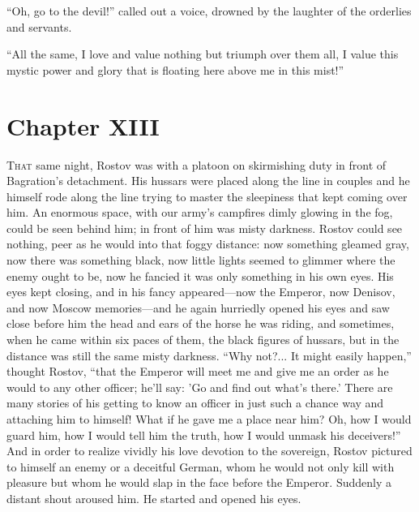 ``Oh, go to the devil!'' called out a voice, drowned by the
laughter of the orderlies and servants.

``All the same, I love and value nothing but triumph over them
all, I value this mystic power and glory that is floating here
above me in this mist!''


\chapter*{Chapter XIII}
\ifaudio     
{} 
\fi

\lettrine[lines=2, loversize=0.3, lraise=0]{\initfamily T}{hat}
same night, Rostov was with a platoon on skirmishing duty in
front of Bagration's detachment. His hussars were placed along
the line in couples and he himself rode along the line trying to
master the sleepiness that kept coming over him. An enormous
space, with our army's campfires dimly glowing in the fog, could
be seen behind him; in front of him was misty darkness. Rostov
could see nothing, peer as he would into that foggy distance: now
something gleamed gray, now there was something black, now little
lights seemed to glimmer where the enemy ought to be, now he
fancied it was only something in his own eyes. His eyes kept
closing, and in his fancy appeared---now the Emperor, now
Denisov, and now Moscow memories---and he again hurriedly opened
his eyes and saw close before him the head and ears of the horse
he was riding, and sometimes, when he came within six paces of
them, the black figures of hussars, but in the distance was still
the same misty darkness. ``Why not?... It might easily happen,''
thought Rostov, ``that the Emperor will meet me and give me an
order as he would to any other officer; he'll say: 'Go and find
out what's there.' There are many stories of his getting to know
an officer in just such a chance way and attaching him to
himself! What if he gave me a place near him? Oh, how I would
guard him, how I would tell him the truth, how I would unmask his
deceivers!''  And in order to realize vividly his love devotion
to the sovereign, Rostov pictured to himself an enemy or a
deceitful German, whom he would not only kill with pleasure but
whom he would slap in the face before the Emperor. Suddenly a
distant shout aroused him. He started and opened his eyes.

